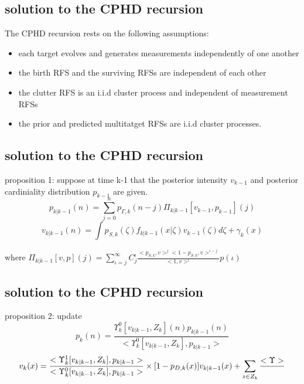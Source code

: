 \documentclass[
paper=128mm:96mm, %
fontsize=11pt, %
pagesize, %
parskip=half-, %
]{scrartcl} %
\theoremstyle{mythmstyle} %
\begin{document}
\clearpage
\subsection{solution to the CPHD recursion}
The CPHD recursion rests on the following assumptions:
\begin{itemize}
\item each target evolves and generates measurements independently of one another
\item the birth RFS and the surviving RFSs are independent of each other
\item the clutter RFS is an i.i.d cluster process and independent of measurement RFSs
\item the prior and predicted multitatget RFSs are i.i.d cluster processes.
\end{itemize}
\clearpage
\subsection{solution to the CPHD recursion}
proposition 1: suppose at time k-1 that the posterior intensity $v_{k-1}$ and posterior cardiniality distribution $p_{k-1}$ are given.
\begin{equation}
   p_{k|k-1}(n) = \sum_{j=0}^{n} p_{\Gamma,k}(n-j)\Pi_{k|k-1}\left[ v_{k-1},p_{k-1} \right](j)
\end{equation}
\begin{equation}
   v_{k|k-1}(n) = \int p_{S,k}(\zeta) f_{k|k-1}(x|\zeta)v_{k-1}(\zeta)d\zeta + \gamma_{k}(x)
\end{equation}

where
$\Pi_{k|k-1}\left[ v,p \right](j) = \sum_{\iota = j}^{\infty} C_{j}^{\iota}  \frac{<p_{S,k},v>^{j} <1-p_{S,k},v>^{\iota-j}}{<1,v>^{\iota}} {p(\iota)}$
\clearpage

\subsection{solution to the CPHD recursion}
proposition 2:  update
\begin{equation}
   p_{k}(n) = \frac{\Upsilon_{k}^{0}[v_{k|k-1},Z_k](n)p_{k|k-1}(n)}{<\Upsilon_{k}^{0}[v_{k|k-1},Z_k],p_{k|k-1}>}
\end{equation}
\begin{equation}
    v_{k}(x) = \frac{<\Upsilon_{k}^{1}[v_{k|k-1},Z_k],p_{k|k-1}>} {<\Upsilon_{k}^{0}[v_{k|k-1},Z_k],p_{k|k-1}>}\\
          \times[1-p_{D,k}(x)]v_{k|k-1}(x) \\
          + \sum_{z\in Z_k} \frac{<\Upsilon>}{}
\end{equation}
\end{document}
